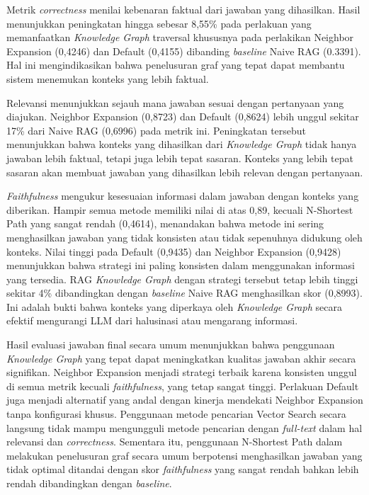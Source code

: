 Metrik \textit{correctness} menilai kebenaran faktual dari jawaban yang dihasilkan.
Hasil menunjukkan peningkatan hingga sebesar 8,55\% pada perlakuan yang memanfaatkan \textit{Knowledge Graph} traversal khususnya pada perlakikan Neighbor Expansion (0,4246) dan  Default (0,4155) dibanding \textit{baseline} Naive RAG (0.3391).
Hal ini mengindikasikan bahwa penelusuran graf yang tepat dapat membantu sistem menemukan konteks yang lebih faktual.

Relevansi menunjukkan sejauh mana jawaban sesuai dengan pertanyaan yang diajukan.
Neighbor Expansion (0,8723) dan Default (0,8624) lebih unggul sekitar 17\% dari Naive RAG (0,6996) pada metrik ini.
Peningkatan tersebut menunjukkan bahwa konteks yang dihasilkan dari \textit{Knowledge Graph} tidak hanya  jawaban lebih faktual, tetapi juga lebih tepat sasaran.
Konteks yang lebih tepat sasaran akan membuat jawaban yang dihasilkan lebih relevan dengan pertanyaan.

\textit{Faithfulness} mengukur kesesuaian informasi dalam jawaban dengan konteks yang diberikan.
Hampir semua metode memiliki nilai di atas 0,89, kecuali N-Shortest Path yang sangat rendah (0,4614), menandakan bahwa metode ini sering menghasilkan jawaban yang tidak konsisten atau tidak sepenuhnya didukung oleh konteks.
Nilai tinggi pada Default (0,9435) dan Neighbor Expansion (0,9428) menunjukkan bahwa strategi ini paling konsisten dalam menggunakan informasi yang tersedia.
RAG \textit{Knowledge Graph} dengan strategi tersebut tetap lebih tinggi sekitar 4\% dibandingkan dengan \textit{baseline} Naive RAG menghasilkan skor (0,8993).
Ini adalah bukti bahwa konteks yang diperkaya oleh \textit{Knowledge Graph} secara efektif mengurangi LLM dari halusinasi atau mengarang informasi.

Hasil evaluasi jawaban final secara umum menunjukkan bahwa penggunaan \textit{Knowledge Graph} yang tepat dapat meningkatkan kualitas jawaban akhir secara signifikan.
Neighbor Expansion menjadi strategi terbaik karena konsisten unggul di semua metrik kecuali \textit{faithfulness}, yang tetap sangat tinggi.
Perlakuan Default juga menjadi alternatif yang andal dengan kinerja mendekati Neighbor Expansion tanpa konfigurasi khusus.
Penggunaan metode pencarian Vector Search secara langsung tidak mampu mengungguli metode pencarian dengan \textit{full-text} dalam hal relevansi dan \textit{correctness}.
Sementara itu, penggunaan N-Shortest Path dalam melakukan penelusuran graf secara umum berpotensi menghasilkan jawaban yang tidak optimal ditandai dengan skor \textit{faithfulness} yang sangat rendah bahkan lebih rendah dibandingkan dengan \textit{baseline}.

